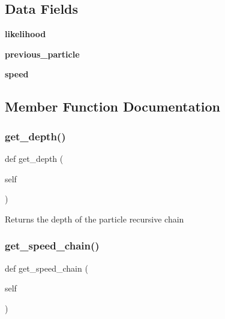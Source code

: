 \subsection*{Data Fields}
\begin{DoxyCompactItemize}
\item 
\mbox{\label{class_emulator_1_1_particle_a0bcacfa65fea4ef51838fdc27cbe79b4}} 
{\bfseries likelihood}
\item 
\mbox{\label{class_emulator_1_1_particle_a41e81c4baf16806437e1e2d564570455}} 
{\bfseries previous\+\_\+particle}
\item 
\mbox{\label{class_emulator_1_1_particle_ab04a44aead88cfdbd44325ec2cf7a33a}} 
{\bfseries speed}
\end{DoxyCompactItemize}


\subsection{Member Function Documentation}
\mbox{\label{class_emulator_1_1_particle_a0a2e587249786c6cd49c4c72792667f5}} 
\subsubsection{\texorpdfstring{get\+\_\+depth()}{get\_depth()}}
{\footnotesize\ttfamily def get\+\_\+depth (\begin{DoxyParamCaption}\item[{}]{self }\end{DoxyParamCaption})}

\begin{DoxyVerb}Returns the depth of the particle recursive chain\end{DoxyVerb}
 \mbox{\label{class_emulator_1_1_particle_af84bb961f8e262b28fe9ae6eb4d61e5f}} 
\subsubsection{\texorpdfstring{get\+\_\+speed\+\_\+chain()}{get\_speed\_chain()}}
{\footnotesize\ttfamily def get\+\_\+speed\+\_\+chain (\begin{DoxyParamCaption}\item[{}]{self }\end{DoxyParamCaption})}

